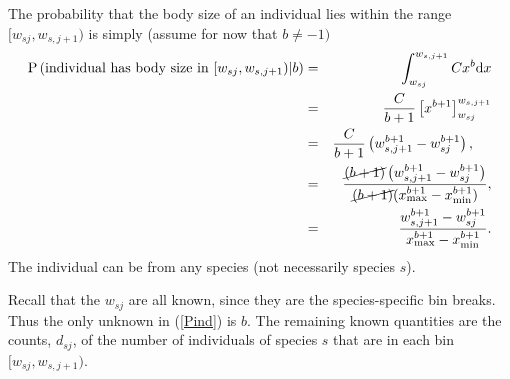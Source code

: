 \documentclass[12pt, letter]{article}
\newcommand{\eb}{\begin{eqnarray}}
\newcommand{\ee}{\end{eqnarray}}
\newcommand{\xmin}{x_{\mathrm{min}}}
\newcommand{\xmax}{x_{\mathrm{max}}}
\begin{document}
The probability that the body size of an individual lies within the range
$[w_{sj}, w_{s, j+1})$ is simply (assume for now that $b \neq -1)$ \eb
  \mbox{P}\left(\mbox{individual has body size in }[w_{sj}, w_{s, j+1}) |
    b\right) & = & \int_{w_{sj}}^{w_{s, j+1}} C x^{b} \mbox{d}x\\ & = &
    \frac{C}{b + 1} \left[ x^{b + 1}\right]_{w_{sj}}^{w_{s, j+1}}\\ & = &
    \frac{C}{b + 1} \left( w_{s, j+1}^{b + 1} - w_{sj}^{b + 1} \right),~~~~\\ &
    = & \frac{\cancel{(b + 1)}\left( w_{s, j+1}^{b + 1} - w_{sj}^{b + 1}
      \right)}{\cancel{(b + 1)}(\xmax^{b+1}-\xmin^{b+1})},\\ & = & \frac{w_{s,
        j+1}^{b + 1} - w_{sj}^{b + 1}}{\xmax^{b+1}-\xmin^{b+1}}.
\label{Pind}
\ee The individual can be from any species (not necessarily species $s$).

Recall that the $w_{sj}$ are all known, since they are the species-specific bin
breaks. Thus the only unknown in (\ref{Pind}) is $b$. The remaining known
quantities are the counts, $d_{sj}$, of the number of individuals of species $s$
that are in each bin $[w_{sj}, w_{s, j+1})$.
\end{document}
